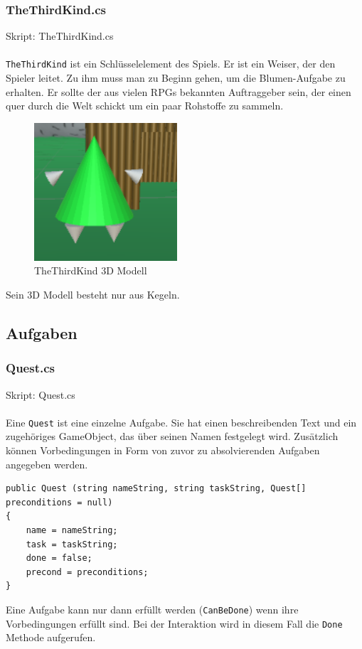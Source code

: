 \subsubsection{TheThirdKind.cs}
Skript: TheThirdKind.cs\\\\
\lstinline{TheThirdKind} ist ein Schlüsselelement des Spiels. Er ist ein Weiser, der den Spieler leitet. Zu ihm muss man zu Beginn gehen, um die Blumen-Aufgabe zu erhalten.
Er sollte der aus vielen RPGs bekannten Auftraggeber sein, der einen quer durch die Welt schickt um ein paar Rohstoffe zu sammeln.
\begin{figure}[H]
\includegraphics[scale=1]{screenshots/t3k.png}
\caption{ TheThirdKind 3D Modell}
\end{figure}
Sein 3D Modell besteht nur aus Kegeln.

\subsection{Aufgaben}

\subsubsection{Quest.cs}
Skript: Quest.cs\\\\
Eine \lstinline{Quest} ist eine einzelne Aufgabe. Sie hat einen beschreibenden Text und ein zugehöriges GameObject, das über seinen Namen festgelegt wird. Zusätzlich können Vorbedingungen in Form von zuvor zu absolvierenden Aufgaben angegeben werden.

\begin{lstlisting}
public Quest (string nameString, string taskString, Quest[] preconditions = null)
{
	name = nameString;
	task = taskString;
	done = false;
	precond = preconditions;
}
\end{lstlisting}

Eine Aufgabe kann nur dann erfüllt werden (\lstinline{CanBeDone}) wenn ihre Vorbedingungen erfüllt sind. Bei der Interaktion wird in diesem Fall die \lstinline{Done} Methode aufgerufen.

